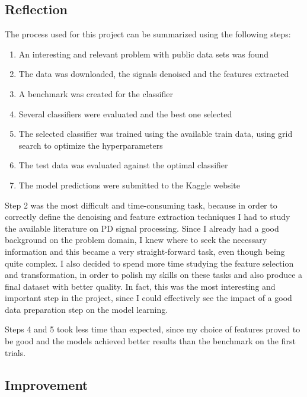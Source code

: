 \documentclass[11pt]{article}
\providecommand{\tightlist}{%
      \setlength{\itemsep}{0pt}\setlength{\parskip}{0pt}}
\begin{document}
\hypertarget{reflection}{%
\subsection{Reflection}\label{reflection}}

The process used for this project can be summarized using the following
steps:

\begin{enumerate}
\def\labelenumi{\arabic{enumi}.}
\tightlist
\item
  An interesting and relevant problem with public data sets was found
\item
  The data was downloaded, the signals denoised and the features
  extracted
\item
  A benchmark was created for the classifier
\item
  Several classifiers were evaluated and the best one selected
\item
  The selected classifier was trained using the available train data,
  using grid search to optimize the hyperparameters
\item
  The test data was evaluated against the optimal classifier
\item
  The model predictions were submitted to the Kaggle website
\end{enumerate}

Step 2 was the most difficult and time-consuming task, because in order
to correctly define the denoising and feature extraction techniques I
had to study the available literature on PD signal processing. Since I
already had a good background on the problem domain, I knew where to
seek the necessary information and this became a very straight-forward
task, even though being quite complex. I also decided to spend more time
studying the feature selection and transformation, in order to polish my
skills on these tasks and also produce a final dataset with better
quality. In fact, this was the most interesting and important step in
the project, since I could effectively see the impact of a good data
preparation step on the model learning.

Steps 4 and 5 took less time than expected, since my choice of features
proved to be good and the models achieved better results than the
benchmark on the first trials.

\hypertarget{improvement}{%
\subsection{Improvement}\label{improvement}}
\end{document}

